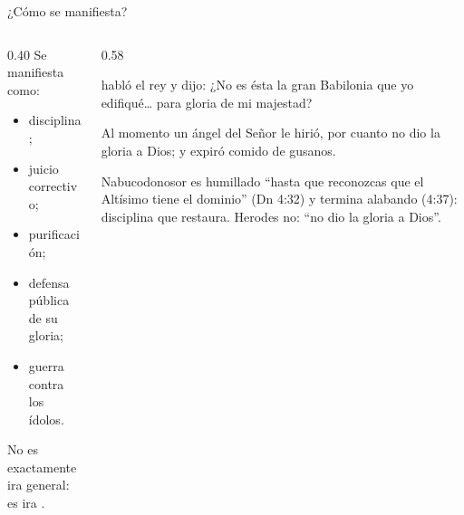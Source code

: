 \begin{frame}{¿Cómo se manifiesta?}
\begin{columns}[t,onlytextwidth]
\begin{column}{0.40\textwidth}\small
Se manifiesta como:
\begin{itemize}
\item disciplina;
\item juicio correctivo;
\item purificación;
\item defensa pública de su gloria;
\item guerra contra los ídolos.
\end{itemize}
\begin{tcolorbox}[colback=papiro,colframe=dorado,boxrule=1.2pt,arc=3pt]
\scriptsize No es exactamente ira general: es ira .
\end{tcolorbox}
\end{column}
\begin{column}{0.58\textwidth}
\begin{cita}habló el rey y dijo: ¿No es ésta la gran Babilonia que yo edifiqué\ldots{} para gloria de mi majestad?\end{cita}
\begin{cita}Al momento un ángel del Señor le hirió, por cuanto no dio la gloria a Dios; y expiró comido de gusanos.\end{cita}
\scriptsize Nabucodonosor es humillado ``hasta que reconozcas que el Altísimo tiene el dominio'' (Dn 4:32) y termina alabando (4:37): disciplina que restaura. Herodes no: ``no dio la gloria a Dios''.
\end{column}
\end{columns}
\end{frame}

